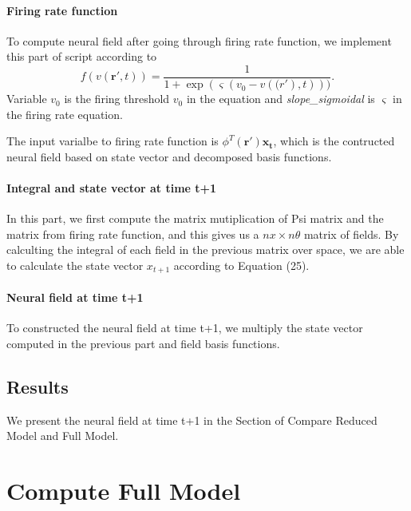 \documentclass[a4paper, 12pt, english]{article}
\begin{document}
\paragraph{Firing rate function\newline}
To compute neural field after going through firing rate function, we implement this
part of script according to
$$f(v(\boldsymbol{r\prime}, t)) = \frac{1}{1+\exp(\varsigma(v_0-v(\boldsymbol(r\prime), t)))}. $$\newline
Variable $v_0 $ is the firing threshold $v_0 $ in the equation and \textit{slope\_sigmoidal}
is $\varsigma $ in the firing rate equation.

The input varialbe to firing rate function is $\phi^T(\boldsymbol{r\prime})\boldsymbol{x_{t}} $,
which is the contructed neural field based on state vector and decomposed basis functions.

\paragraph{Integral and state vector at time t+1\newline}
In this part, we first compute the matrix mutiplication of Psi matrix and the matrix from firing rate function,
and this gives us a $nx\times n\theta$ matrix of fields.
By calculting the integral of each field in the previous matrix over space, we are
able to calculate the state vector $x_{t+1} $ according to Equation (25).

\paragraph{Neural field at time t+1\newline}
To constructed the neural field at time t+1, we multiply the state vector computed
in the previous part and field basis functions.

\subsection{Results}
We present the neural field at time t+1 in the Section of Compare Reduced Model and Full Model.

\newpage





\section{Compute Full Model}
\end{document}
